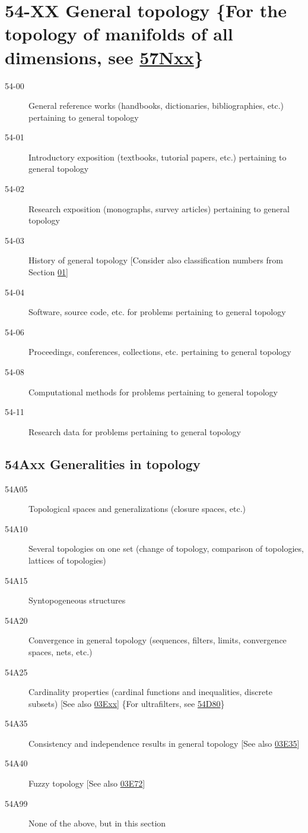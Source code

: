 \section*{54-XX General topology \{For the topology of manifolds of all dimensions, see \hyperref[57Nxx]{57Nxx}\} }\label{54-XX}
\begin{description}
\item [54-00]\label{54-00} General reference works (handbooks, dictionaries, bibliographies, etc.) pertaining to general topology
\item [54-01]\label{54-01} Introductory exposition (textbooks, tutorial papers, etc.) pertaining to general topology
\item [54-02]\label{54-02} Research exposition (monographs, survey articles) pertaining to general topology
\item [54-03]\label{54-03} History of general topology [Consider also classification numbers from Section \hyperref[01-XX]{01}]
\item [54-04]\label{54-04} Software, source code, etc. for problems pertaining to general topology
\item [54-06]\label{54-06} Proceedings, conferences, collections, etc. pertaining to general topology
\item [54-08]\label{54-08} Computational methods for problems pertaining to general topology
\item [54-11]\label{54-11} Research data for problems pertaining to general topology
\end{description}
\subsection*{54Axx  Generalities in topology}\label{54Axx}
\begin{description}  
\item [54A05]\label{54A05} Topological spaces and generalizations (closure spaces, etc.)
\item [54A10]\label{54A10} Several topologies on one set (change of topology, comparison of topologies, lattices of topologies)
\item [54A15]\label{54A15} Syntopogeneous structures
\item [54A20]\label{54A20} Convergence in general topology (sequences, filters, limits, convergence spaces, nets, etc.)
\item [54A25]\label{54A25} Cardinality properties (cardinal functions and inequalities, discrete subsets) [See also \hyperref[03Exx]{03Exx}] \{For ultrafilters, see \hyperref[54D80]{54D80}\}
\item [54A35]\label{54A35} Consistency and independence results in general topology [See also \hyperref[03E35]{03E35}]
\item [54A40]\label{54A40} Fuzzy topology [See also \hyperref[03E72]{03E72}]
\item [54A99]\label{54A99} None of the above, but in this section
\end{description}
